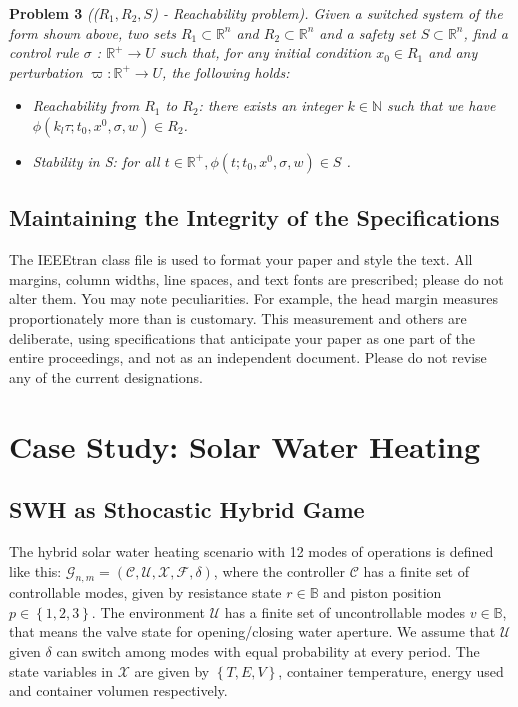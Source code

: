 \documentclass[conference]{IEEEtran}
\begin{document}
 
\textbf{Problem 3} \emph{((${R_1,R_2,S}$) - Reachability problem).
Given a switched system of the form shown above, two sets  
${ R_1 \subset \mathbb{R}^n}$  and ${ R_2 \subset \mathbb{R}^n}$ 
and a safety set  ${S \subset  \mathbb{R}^n}$, find a control rule 
${\sigma}$ :
${\mathbb{R}^+\rightarrow U}$ such that, for any initial condition 
${x_0  \in  R_1}$ and any perturbation  ${\varpi : \mathbb{R}^+  
\rightarrow U}$, the following holds:}

\begin{itemize}
  \item  \emph{Reachability from ${R_1}$ to ${R_2}$: there exists 
  an integer ${k \in \mathbb{N} }$ such that we have ${ \phi( k_l\tau
  ;t_0,x^0,\sigma,w) \in R_2 }$.}
  
  \item \emph{ Stability in S: for all ${ t \in \mathbb{R}^+, 
  \phi(t;t_0,x^0,\sigma,w) \in S}$ .}
\end{itemize}



\subsection{Maintaining the Integrity of the Specifications}

The IEEEtran class file is used to format your paper and style the text. All margins, 
column widths, line spaces, and text fonts are prescribed; please do not 
alter them. You may note peculiarities. For example, the head margin
measures proportionately more than is customary. This measurement 
and others are deliberate, using specifications that anticipate your paper 
as one part of the entire proceedings, and not as an independent document. 
Please do not revise any of the current designations.

\section{Case Study: Solar Water Heating}


\subsection{SWH as Sthocastic Hybrid Game}
The hybrid solar water heating scenario with 12 modes of operations is
defined  like this: $\mathcal{G}_{n,m} = (\mathcal{C,U,X,F},\delta)$, 
where the controller $\mathcal{C}$ has a finite set of controllable modes,
given by resistance state ${r \in \mathbb{B}}$ and piston position $p \in 
\left\lbrace1,2,3\right\rbrace $. The environment $\mathcal{U}$ has a finite  
set of uncontrollable modes $v \in \mathbb{B} $, that means the valve state 
for opening/closing water aperture. We assume that $\mathcal{U}$ given
$\delta$ can switch among modes with equal probability at every period. 
The state variables in $\mathcal{X}$ are given by $\left\lbrace
T,E,V \right\rbrace $, container temperature, energy used and container volumen
respectively.
\end{document}
